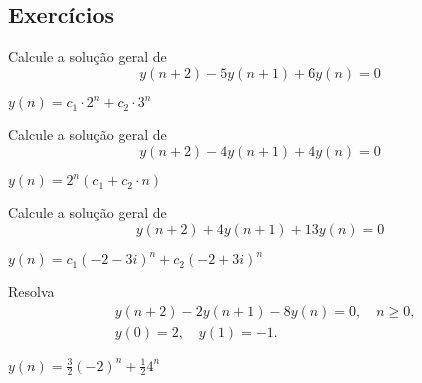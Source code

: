 \subsection*{Exercícios}

\begin{exer}
  Calcule a solução geral de
  \begin{equation}
    y(n+2) - 5y(n+1) + 6y(n) = 0
  \end{equation}
\end{exer}
\begin{resp}
  $y(n) = c_1\cdot 2^n + c_2\cdot 3^n$
\end{resp}

\begin{exer}
  Calcule a solução geral de
  \begin{equation}
    y(n+2) - 4y(n+1) + 4y(n) = 0
  \end{equation}
\end{exer}
\begin{resp}
  $y(n) = 2^n(c_1 + c_2\cdot n)$
\end{resp}

\begin{exer}
  Calcule a solução geral de
  \begin{equation}
    y(n+2) + 4y(n+1) + 13y(n) = 0
  \end{equation}
\end{exer}
\begin{resp}
  $y(n) = c_1(-2-3i)^n + c_2(-2+3i)^n$
\end{resp}

\begin{exer}
  Resolva
  \begin{align}
    &y(n+2) - 2y(n+1) - 8y(n) = 0,\quad n\geq 0,\\
    &y(0)=2,\quad y(1)=-1.
  \end{align}
\end{exer}
\begin{resp}
  $y(n) = \frac{3}{2}(-2)^n + \frac{1}{2}4^n$
\end{resp}
